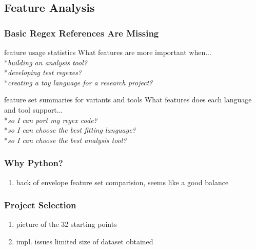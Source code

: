 \subsection{Feature Analysis}

\begin{frame}
\frametitle{Basic Regex References Are Missing}
\begin{block}{feature usage statistics}
What features are more important when...
\\*\emph{building an analysis tool?}
\\*\emph{developing test regexes?}
\\*\emph{creating a toy language for a research project?}
\end{block}
\begin{block}{feature set summaries for variants and tools}
What features does each language and tool support...
\\*\emph{so I can port my regex code?}
\\*\emph{so I can choose the best fitting language?}
\\*\emph{so I can choose the best analysis tool?}
\end{block}
\end{frame}


\begin{frame}
\frametitle{Why Python?}
\begin{enumerate}
\item back of envelope feature set comparision, seems like a good balance
\end{enumerate}
\end{frame}


\begin{frame}
\frametitle{Project Selection}
\begin{enumerate}
\item picture of the 32 starting points
\item impl. issues limited size of dataset obtained
\end{enumerate}
\end{frame}

